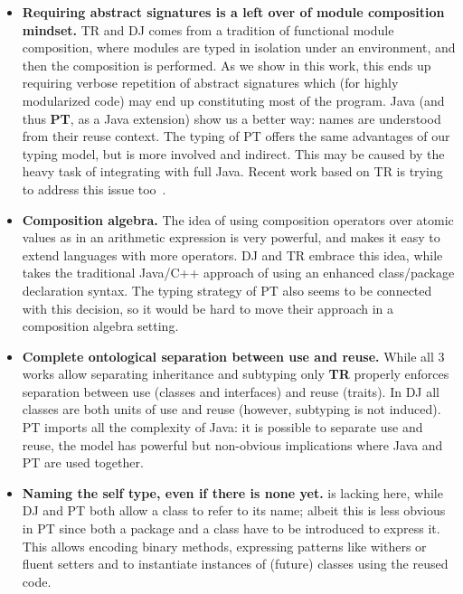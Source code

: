 \begin{itemize}
\item 
{\bf Requiring abstract signatures is a left over of module composition mindset.}
TR and DJ comes from a tradition of functional module composition, where 
modules are typed in isolation under an environment, and then the composition is performed.
As we show in this work, this ends up requiring verbose repetition of abstract signatures
which (for highly modularized code) may end up constituting most of the program.
Java (and thus \textbf{PT}, as a Java extension) show us a better way:
names are understood from their reuse context.
The typing of PT offers the same advantages of our typing model, 
but is more involved and indirect. This may be caused by the
heavy task of integrating with full Java.
Recent work based on TR is trying to address this issue too~\cite{damiani2017unified}.
\item {\bf Composition algebra.}
The idea of using composition operators over atomic values as in an arithmetic expression is very powerful,
and makes it easy to extend languages with more operators. DJ and TR embrace this idea, while  takes the traditional Java/C++ approach of using an enhanced class/package declaration syntax.
The typing strategy of PT also seems to be connected with this
decision, so it would be hard to move their approach in a composition
algebra setting.
\item {\bf Complete ontological separation between use and reuse.}
While all $3$ works allow separating inheritance and subtyping only \textbf{TR} properly enforces 
separation between use (classes and interfaces) and reuse (traits).
In DJ all classes are both units of use and reuse (however, subtyping is not induced).
PT imports all the complexity of Java: it is possible to separate use and reuse, the model has powerful but non-obvious implications where Java \Q@extends@ and PT are used together.
\item {\bf Naming the self type, even if there is none yet.}
 is lacking here, while DJ and PT both allow a class to refer to its name; albeit this is
less obvious in PT since both a package and a class have to be introduced to express it.
This allows encoding binary methods, expressing patterns like withers or fluent setters and to instantiate instances of (future) classes  using the reused code.
\end{itemize}
\saveSpace
